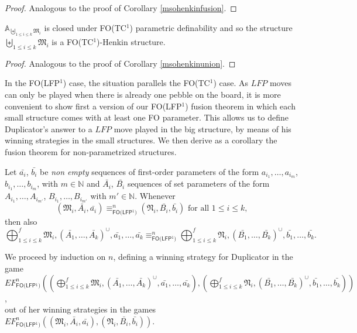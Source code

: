 \documentclass{LMCS}
\newcommand{\frM}{\mathfrak{M}}
\newcommand{\frN}{\mathfrak{N}}
\newcommand{\fo}{\textsf{FO}\xspace}
\newcommand{\fotc}{\textsf{FO(TC$^1$)}\xspace}
\newcommand{\folfp}{\textsf{FO(LFP$^1$)}\xspace}
\begin{document}
\begin{proof}
Analogous to the proof of Corollary \ref{msohenkinfusion}.
\end{proof}

\begin{cor}
$\mathbb{A}_{\biguplus_{ 1 \leq i \leq k} \frM_i}$ is closed
under \fotc parametric definability and so the structure $\biguplus_{ 1 \leq i \leq k} \frM_i$ is a \fotc-Henkin
structure.\label{fotchenkinunion}
\end{cor}
\begin{proof}
Analogous to the proof of Corollary \ref{msohenkinunion}.
\end{proof}


In the \folfp case, the situation parallels the \fotc case. As $LFP$ moves can only be played when there is already one pebble on the board, it is more convenient to show first a version of our \folfp fusion theorem in which each small structure comes with at least one \fo parameter. This allows us to define Duplicator's answer to a $LFP$ move played in the big structure, by means of his winning strategies in the small structures. We then derive as a corollary the fusion theorem for non-parametrized structures.

\begin{thm}[Fusion Theorem for \folfp]
Let $\bar{a_i}$, $\bar{b_i}$ be \emph{non empty} sequences of first-order
parameters of the form $a_{i_1},\ldots,a_{i_m}$, $b_{i_1},\ldots,b_{i_m}$, with
$m\in\mathbb{N}$ and $\bar{A_i}$, $\bar{B_i}$ sequences of set parameters of
the form $A_{i_1},\ldots,A_{i_{m'}}$, $B_{i_1},\ldots,B_{i_{m'}}$ with $m'\in\mathbb{N}$.
Whenever
$$(\frM_i,\bar{A_i},\bar{a_i})\equiv_\folfp^n(\frN_i,\bar{B_i},\bar{b_i})\text{ for all }1\leq i\leq k,$$
then also $$\bigoplus_{1\leq i\leq k}^f \frM_i,
(\bar{A_1},\ldots,\bar{A_k})^\cup,\bar{a_1},\ldots,\bar{a_k}\equiv_\folfp^n
\bigoplus_{1\leq i\leq k}^f
\frN_i,(\bar{B_1},\ldots,\bar{B_k})^\cup,\bar{b_1},\ldots,\bar{b_k}.$$
\end{thm}

\proof
We proceed by induction on $n$, defining a winning strategy for Duplicator in the game $EF_\folfp^n((\bigoplus_{1\leq i\leq k}^f \frM_i,
(\bar{A_1},\ldots,\bar{A_k})^\cup,\bar{a_1},\ldots,\bar{a_k}),(\bigoplus_{1\leq i \leq k}^f
\frN_i,(\bar{B_1},\ldots,\bar{B_k})^\cup,
\bar{b_1},\ldots,\bar{b_k}))$,\\
 out of her winning strategies in
the games
$EF_\folfp^n((\frM_i,\bar{A_i},\bar{a_i}),(\frN_i,\bar{B_i},\bar{b_i}))$.
\end{document}
